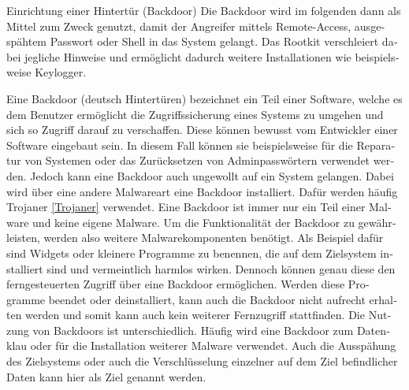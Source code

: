 \begin{otherlanguage}{ngerman}
    Einrichtung einer Hintertür (Backdoor)
    \newline Die Backdoor wird im folgenden dann als Mittel zum Zweck genutzt, damit der Angreifer mittels Remote-Access, ausgespähtem Passwort oder Shell in das System gelangt. Das Rootkit verschleiert dabei jegliche Hinweise und ermöglicht dadurch weitere Installationen wie beispielsweise Keylogger.
    
    Eine Backdoor (deutsch \dq Hintertüren\dq) bezeichnet ein Teil einer Software, welche es dem Benutzer ermöglicht die Zugriffssicherung eines Systems zu umgehen und sich so Zugriff darauf zu verschaffen. Diese können bewusst vom Entwickler einer Software eingebaut sein. In diesem Fall können sie beispielsweise für die Reparatur von Systemen oder das Zurücksetzen von Adminpasswörtern verwendet werden. Jedoch kann eine Backdoor auch ungewollt auf ein System gelangen. Dabei wird über eine andere Malwareart eine Backdoor installiert. Dafür werden häufig Trojaner \ref{Trojaner} verwendet. Eine Backdoor ist immer nur ein Teil einer Malware und keine eigene Malware. Um die Funktionalität der Backdoor zu gewährleisten, werden also weitere Malwarekomponenten benötigt. Als Beispiel dafür sind Widgets oder kleinere Programme zu benennen, die auf dem Zielsystem installiert sind und vermeintlich harmlos wirken. Dennoch können genau diese den ferngesteuerten Zugriff über eine Backdoor ermöglichen. Werden diese Programme beendet oder deinstalliert, kann auch die Backdoor nicht aufrecht erhalten werden und somit kann auch kein weiterer Fernzugriff stattfinden.
    Die Nutzung von Backdoors ist unterschiedlich. Häufig wird eine Backdoor zum Datenklau oder für die Installation weiterer Malware verwendet. Auch die Ausspähung des Zielsystems oder auch die Verschlüsselung einzelner auf dem Ziel befindlicher Daten kann hier als Ziel genannt werden.
    

\end{otherlanguage}

